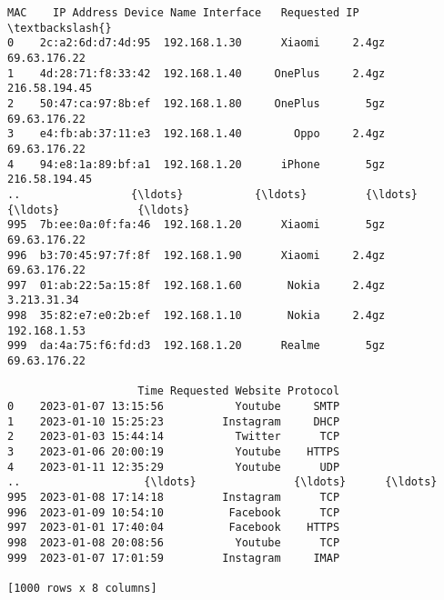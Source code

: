 \documentclass[11pt]{article}
\makeatletter
\newcommand{\boxspacing}{\kern\kvtcb@left@rule\kern\kvtcb@boxsep}
\newcommand{\prompt}[4]{
        {\ttfamily\llap{{\color{#2}[#3]:\hspace{3pt}#4}}\vspace{-\baselineskip}}
    }
\makeatother
\begin{document}
            \begin{tcolorbox}[breakable, size=fbox, boxrule=.5pt, pad at break*=1mm, opacityfill=0]
\prompt{Out}{outcolor}{22}{\boxspacing}
\begin{Verbatim}[commandchars=\\\{\}]
                   MAC    IP Address Device Name Interface   Requested IP  \textbackslash{}
0    2c:a2:6d:d7:4d:95  192.168.1.30      Xiaomi     2.4gz   69.63.176.22
1    4d:28:71:f8:33:42  192.168.1.40     OnePlus     2.4gz  216.58.194.45
2    50:47:ca:97:8b:ef  192.168.1.80     OnePlus       5gz   69.63.176.22
3    e4:fb:ab:37:11:e3  192.168.1.40        Oppo     2.4gz   69.63.176.22
4    94:e8:1a:89:bf:a1  192.168.1.20      iPhone       5gz  216.58.194.45
..                 {\ldots}           {\ldots}         {\ldots}       {\ldots}            {\ldots}
995  7b:ee:0a:0f:fa:46  192.168.1.20      Xiaomi       5gz   69.63.176.22
996  b3:70:45:97:7f:8f  192.168.1.90      Xiaomi     2.4gz   69.63.176.22
997  01:ab:22:5a:15:8f  192.168.1.60       Nokia     2.4gz    3.213.31.34
998  35:82:e7:e0:2b:ef  192.168.1.10       Nokia     2.4gz   192.168.1.53
999  da:4a:75:f6:fd:d3  192.168.1.20      Realme       5gz   69.63.176.22

                    Time Requested Website Protocol
0    2023-01-07 13:15:56           Youtube     SMTP
1    2023-01-10 15:25:23         Instagram     DHCP
2    2023-01-03 15:44:14           Twitter      TCP
3    2023-01-06 20:00:19           Youtube    HTTPS
4    2023-01-11 12:35:29           Youtube      UDP
..                   {\ldots}               {\ldots}      {\ldots}
995  2023-01-08 17:14:18         Instagram      TCP
996  2023-01-09 10:54:10          Facebook      TCP
997  2023-01-01 17:40:04          Facebook    HTTPS
998  2023-01-08 20:08:56           Youtube      TCP
999  2023-01-07 17:01:59         Instagram     IMAP

[1000 rows x 8 columns]
\end{Verbatim}
\end{tcolorbox}
        
\end{document}
